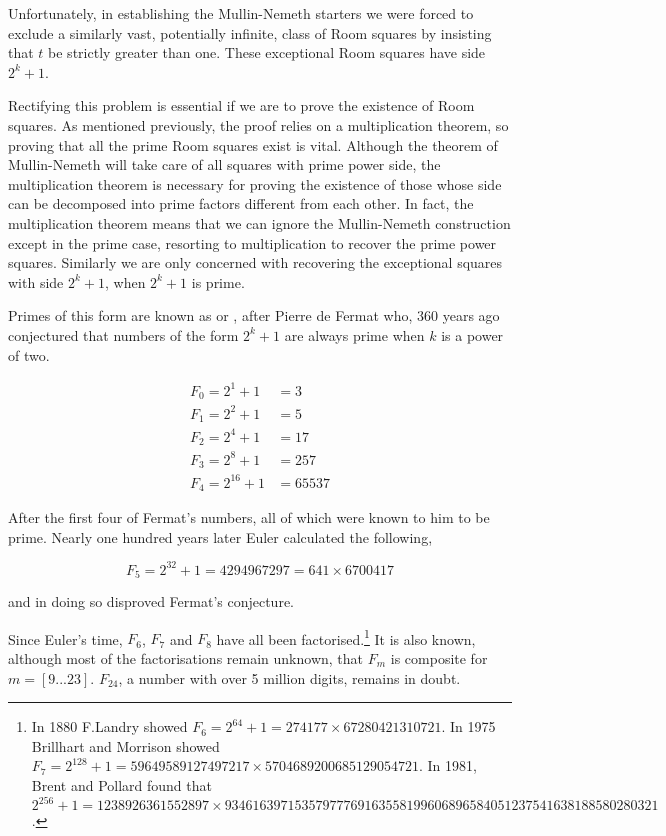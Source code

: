 Unfortunately, in establishing the Mullin-Nemeth starters we were forced to exclude a similarly vast, potentially infinite, class of Room squares by insisting that $t$ be strictly greater than one.
These exceptional Room squares have side $2^k + 1$.

Rectifying this problem is essential if we are to prove the existence of Room squares.
As mentioned previously, the proof relies on a multiplication theorem, so proving that all the prime Room squares exist is vital.
Although the theorem of Mullin-Nemeth will take care of all squares with prime power side, the multiplication theorem is necessary for proving the existence of those whose side can be decomposed into prime factors different from each other.
In fact, the multiplication theorem means that we can ignore the Mullin-Nemeth construction except in the prime case, resorting to multiplication to recover the prime power squares.
Similarly we are only concerned with recovering the exceptional squares with side $2^k + 1$, when $2^k + 1$ is prime.

Primes of this form are known as  or , after Pierre de Fermat who, 360 years ago conjectured that numbers of the form $2^k + 1$ are always prime when $k$ is a power of two.

\begin{align*}
  F_0 = 2^1 + 1 &= 3 \\
  F_1 = 2^2 + 1 &= 5 \\
  F_2 = 2^4 + 1 &= 17 \\
  F_3 = 2^8 + 1 &= 257 \\
  F_4 = 2^{16} + 1 &= 65537
\end{align*}

After the first four of Fermat’s numbers, all of which were known to him to be prime.
Nearly one hundred years later Euler calculated the following,

\begin{equation}
F_5 = 2^{32}+1 = 4294967297 = 641\times 6700417
\end{equation}

and in doing so disproved Fermat’s conjecture.

Since Euler’s time, $F_6$, $F_7$ and $F_8$ have all been factorised.\footnote{In 1880 F.Landry showed $F_6=2^{64}+1=274177 \times 67280421310721$.
In 1975 Brillhart and Morrison showed $F_7=2^{128}+1=59649589127497217 \times 5704689200685129054721$.
In 1981, Brent and Pollard found that $2^{256}+1=1238926361552897 \times 93461639715357977769163558199606896584051237541638188580280321$.}
It is also known, although most of the factorisations remain unknown, that $F_m$ is composite for $m = [9...23]$.
$F_{24}$, a number with over 5 million digits, remains in doubt.

